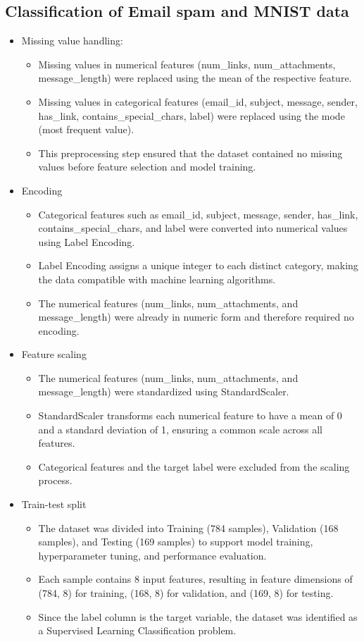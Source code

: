\documentclass[12pt,a4paper]{article}
\begin{document}
\subsection*{Classification of Email spam and MNIST data}
\begin{itemize}
\item Missing value handling:
\begin{itemize}
\item Missing values in numerical features (num\_links, num\_attachments, message\_length) were replaced using the mean of the respective feature.
\item Missing values in categorical features (email\_id, subject, message, sender, has\_link, contains\_special\_chars, label) were replaced using the mode (most frequent value).
\item This preprocessing step ensured that the dataset contained no missing values before feature selection and model training.
\end{itemize}
\item Encoding
\begin{itemize}
\item Categorical features such as email\_id, subject, message, sender, has\_link, contains\_special\_chars, and label were converted into numerical values using Label Encoding.
\item Label Encoding assigns a unique integer to each distinct category, making the data compatible with machine learning algorithms.
\item The numerical features (num\_links, num\_attachments, and message\_length) were already in numeric form and therefore required no encoding.
\end{itemize}
\item Feature scaling
\begin{itemize}
\item The numerical features (num\_links, num\_attachments, and message\_length) were standardized using StandardScaler.
\item StandardScaler transforms each numerical feature to have a mean of 0 and a standard deviation of 1, ensuring a common scale across all features.
\item Categorical features and the target label were excluded from the scaling process.
\end{itemize}
\item Train-test split
\begin{itemize}
\item The dataset was divided into Training (784 samples), Validation (168 samples), and Testing (169 samples) to support model training, hyperparameter tuning, and performance evaluation.
\item Each sample contains 8 input features, resulting in feature dimensions of (784, 8) for training, (168, 8) for validation, and (169, 8) for testing.
\item Since the label column is the target variable, the dataset was identified as a Supervised Learning Classification problem.
\end{itemize}
\end{itemize}
\end{document}
